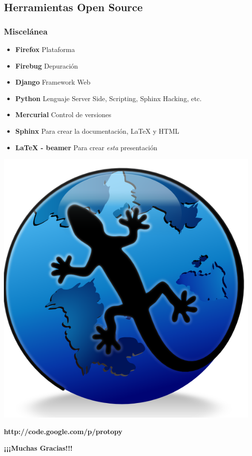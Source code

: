 \documentclass{beamer}
\begin{document}
\subsection{Herramientas Open Source}
\begin{frame}
    \frametitle{Miscelánea}
    \begin{itemize}
        \item {\bf Firefox} Plataforma
        \item {\bf Firebug} Depuración
        \item {\bf Django} Framework Web
        \item {\bf Python} Lenguaje Server Side, Scripting, Sphinx Hacking, etc.
        \item {\bf Mercurial} Control de versiones
        \item {\bf Sphinx} Para crear la documentación, \LaTeX{} y HTML
        \item {\bf \LaTeX{} - beamer} Para crear {\it esta} presentación
    \end{itemize}
\end{frame}

\begin{frame}
    
    
    \begin{center}
        \vfill
        \includegraphics[scale=0.3]{protopy.png}\par
        {\LARGE\bf http://code.google.com/p/protopy}
        \vfill
    \end{center}
        
    
    
\end{frame}


\begin{frame}
    \vfill
    \begin{center}
        {\Huge\bf ¡¡¡Muchas Gracias!!!}
    \end{center}
        
    
    \vfill
\end{frame}
\end{document}
